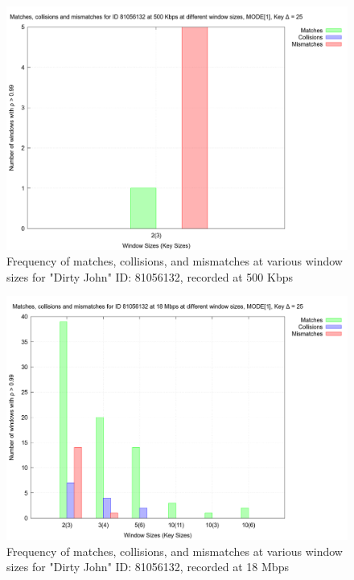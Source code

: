 \begin{figure}[!h]
  \centering
  \includegraphics[width=\columnwidth]{img/acc_81056132_500.png}
  \caption{Frequency of matches, collisions, and mismatches  at various window
  sizes for "Dirty John" ID: 81056132, recorded at 500 Kbps}
  \label{fig:matches_1}
\end{figure}
\begin{figure}[!h]
  \centering
  \includegraphics[width=\columnwidth]{img/acc_81056132_18000.png}
  \caption{Frequency of matches, collisions, and mismatches  at various window
  sizes for "Dirty John" ID: 81056132, recorded at 18 Mbps}
  \label{fig:matches_2}
\end{figure}


